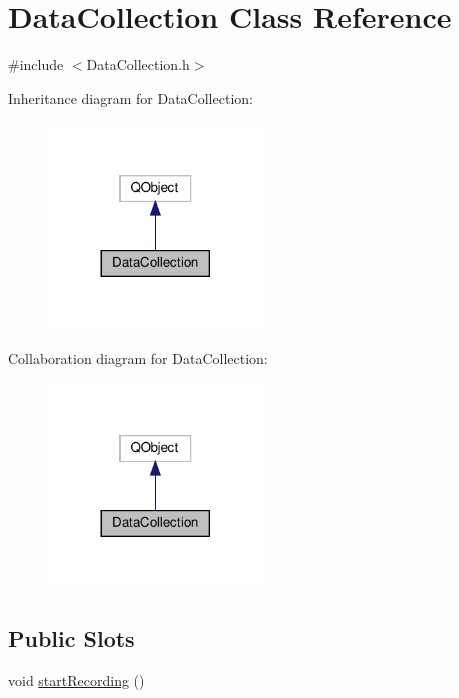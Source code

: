 \hypertarget{class_data_collection}{}\section{Data\+Collection Class Reference}
\label{class_data_collection}


{\ttfamily \#include $<$Data\+Collection.\+h$>$}



Inheritance diagram for Data\+Collection\+:
\nopagebreak
\begin{figure}[H]
\begin{center}
\leavevmode
\includegraphics[width=161pt]{class_data_collection__inherit__graph}
\end{center}
\end{figure}


Collaboration diagram for Data\+Collection\+:
\nopagebreak
\begin{figure}[H]
\begin{center}
\leavevmode
\includegraphics[width=161pt]{class_data_collection__coll__graph}
\end{center}
\end{figure}
\subsection*{Public Slots}
\begin{DoxyCompactItemize}
\item 
void \hyperlink{class_data_collection_ae8d0c9f26d1ea90c725d5de873773da1}{start\+Recording} ()
\end{DoxyCompactItemize}
